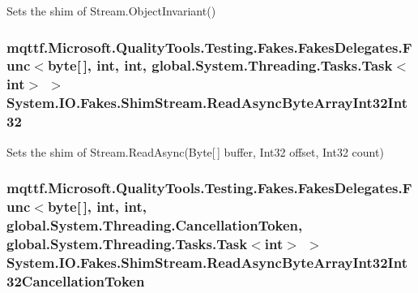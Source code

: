 Sets the shim of Stream.\-Object\-Invariant()

\hypertarget{class_system_1_1_i_o_1_1_fakes_1_1_shim_stream_ace48edcc00d037371e727d27a009030e}{
\subsubsection[{Read\-Async\-Byte\-Array\-Int32\-Int32}]{\setlength{\rightskip}{0pt plus 5cm}mqttf.\-Microsoft.\-Quality\-Tools.\-Testing.\-Fakes.\-Fakes\-Delegates.\-Func$<$byte\mbox{[}$\,$\mbox{]}, int, int, global.\-System.\-Threading.\-Tasks.\-Task$<$int$>$ $>$ System.\-I\-O.\-Fakes.\-Shim\-Stream.\-Read\-Async\-Byte\-Array\-Int32\-Int32\hspace{0.3cm}{\ttfamily [set]}}}\label{class_system_1_1_i_o_1_1_fakes_1_1_shim_stream_ace48edcc00d037371e727d27a009030e}


Sets the shim of Stream.\-Read\-Async(\-Byte\mbox{[}$\,$\mbox{]} buffer, Int32 offset, Int32 count)

\hypertarget{class_system_1_1_i_o_1_1_fakes_1_1_shim_stream_a0127b225db91b4b591e8f3e277f572d8}{
\subsubsection[{Read\-Async\-Byte\-Array\-Int32\-Int32\-Cancellation\-Token}]{\setlength{\rightskip}{0pt plus 5cm}mqttf.\-Microsoft.\-Quality\-Tools.\-Testing.\-Fakes.\-Fakes\-Delegates.\-Func$<$byte\mbox{[}$\,$\mbox{]}, int, int, global.\-System.\-Threading.\-Cancellation\-Token, global.\-System.\-Threading.\-Tasks.\-Task$<$int$>$ $>$ System.\-I\-O.\-Fakes.\-Shim\-Stream.\-Read\-Async\-Byte\-Array\-Int32\-Int32\-Cancellation\-Token\hspace{0.3cm}{\ttfamily [set]}}}\label{class_system_1_1_i_o_1_1_fakes_1_1_shim_stream_a0127b225db91b4b591e8f3e277f572d8}


